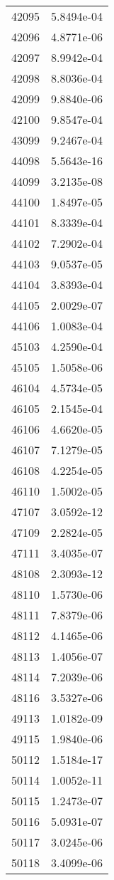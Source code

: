 \begin{table}[h!]
\begin{tabular}{|| c || c |}
42095 & 5.8494e-04 \\
42096 & 4.8771e-06 \\
42097 & 8.9942e-04 \\
42098 & 8.8036e-04 \\
42099 & 9.8840e-06 \\
42100 & 9.8547e-04 \\
43099 & 9.2467e-04 \\
44098 & 5.5643e-16 \\
44099 & 3.2135e-08 \\
44100 & 1.8497e-05 \\
44101 & 8.3339e-04 \\
44102 & 7.2902e-04 \\
44103 & 9.0537e-05 \\
44104 & 3.8393e-04 \\
44105 & 2.0029e-07 \\
44106 & 1.0083e-04 \\
45103 & 4.2590e-04 \\
45105 & 1.5058e-06 \\
46104 & 4.5734e-05 \\
46105 & 2.1545e-04 \\
46106 & 4.6620e-05 \\
46107 & 7.1279e-05 \\
46108 & 4.2254e-05 \\
46110 & 1.5002e-05 \\
47107 & 3.0592e-12 \\
47109 & 2.2824e-05 \\
47111 & 3.4035e-07 \\
48108 & 2.3093e-12 \\
48110 & 1.5730e-06 \\
48111 & 7.8379e-06 \\
48112 & 4.1465e-06 \\
48113 & 1.4056e-07 \\
48114 & 7.2039e-06 \\
48116 & 3.5327e-06 \\
49113 & 1.0182e-09 \\
49115 & 1.9840e-06 \\
50112 & 1.5184e-17 \\
50114 & 1.0052e-11 \\
50115 & 1.2473e-07 \\
50116 & 5.0931e-07 \\
50117 & 3.0245e-06 \\
50118 & 3.4099e-06 \\

\end{tabular}
\end{table}
